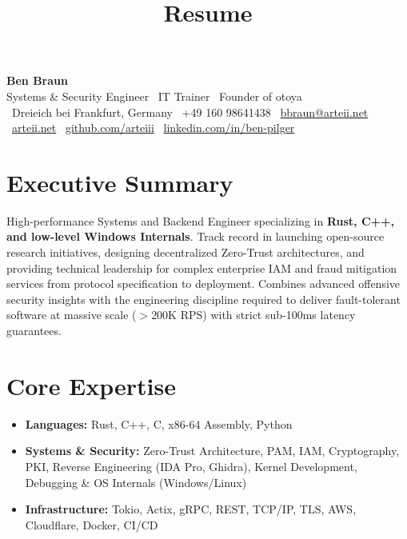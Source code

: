 \documentclass[10pt,a4paper]{article}
\title{Resume}
\begin{document}
\begin{center}
    {\Huge \textbf{\color{primary} Ben Braun}} \\
    \vspace{3pt}
    {\large Systems \& Security Engineer \textbar\ IT Trainer \textbar\ Founder of otoya} \\
    \vspace{5pt}
    \small
    \faMapMarker* \ Dreieich bei Frankfurt, Germany \quad
    \faPhone \ +49 160 98641438 \quad
    \faEnvelope \ \href{mailto:bbraun@arteii.net}{bbraun@arteii.net} \\ \vspace{3pt}
    \faGlobe \ \href{https://arteii.net}{arteii.net} \quad
    \faGithub \ \href{https://github.com/arteiii}{github.com/arteiii} \quad
    \faLinkedin \ \href{https://linkedin.com/in/ben-pilger}{linkedin.com/in/ben-pilger}
\end{center}

\vspace{0.1em}

\section{Executive Summary}
\noindent High-performance Systems and Backend Engineer specializing in \textbf{Rust, C++, and low-level Windows Internals}. Track record in launching open-source research initiatives, designing decentralized Zero-Trust architectures, and providing technical leadership for complex enterprise IAM and fraud mitigation services from protocol specification to deployment. Combines advanced offensive security insights with the engineering discipline required to deliver fault-tolerant software at massive scale ($>$200K RPS) with strict sub-100ms latency guarantees.

\section{Core Expertise}
\begin{itemize}[leftmargin=0pt, listparindent=0pt, label={}]
    \item \textbf{Languages:} Rust, C++, C, x86-64 Assembly, Python
    \item \textbf{Systems \& Security:} Zero-Trust Architecture, PAM, IAM, Cryptography, PKI, Reverse Engineering (IDA Pro, Ghidra), Kernel Development, Debugging \& OS Internals (Windows/Linux)
    \item \textbf{Infrastructure:} Tokio, Actix, gRPC, REST, TCP/IP, TLS, AWS, Cloudflare, Docker, CI/CD
\end{itemize}
\end{document}
